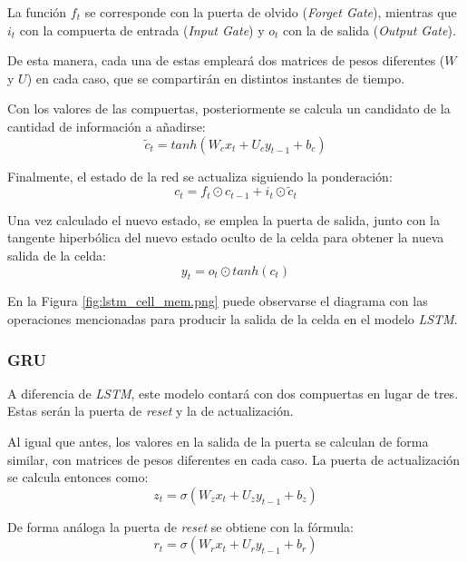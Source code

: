 La función \(f_t\) se corresponde con la puerta de olvido (\textit{Forget Gate}), mientras que 
\(i_t\) con la compuerta de entrada (\textit{Input Gate}) y \(o_t\) con la de salida (\textit{Output
Gate}).

De esta manera, cada una de estas empleará dos matrices de pesos diferentes (\(W\) y \(U\)) en cada caso, que se compartirán
en distintos instantes de tiempo.

Con los valores de las compuertas, posteriormente se calcula un candidato de la cantidad de información
a añadirse:
\begin{equation}
    \widetilde{c}_t = tanh (W_{c} x_t + U_{c} y_{t-1} + b_c) 
\end{equation}

Finalmente, el estado de la red se actualiza siguiendo la ponderación:
\begin{equation}
    c_t = f_t \odot  c_{t-1} + i_{t} \odot \widetilde{c}_t 
\end{equation}

Una vez calculado el nuevo estado, se emplea la puerta de salida, junto con la tangente hiperbólica
del nuevo estado oculto de la celda para obtener la nueva salida de la celda:
\begin{equation}
    y_t =  o_t \odot tanh(c_t)
\end{equation}

En la Figura \ref{fig:lstm_cell_mem.png} puede observarse el diagrama con las operaciones mencionadas
para producir la salida de la celda en el modelo \textit{LSTM}.

\subsubsection{GRU}
A diferencia de \textit{LSTM}, este modelo contará con dos compuertas en lugar 
de tres. Estas serán la puerta de \textit{reset} y la de actualización.

Al igual que antes, los valores en la salida de la puerta se calculan de forma similar,
con matrices de pesos diferentes en cada caso.
La puerta de actualización se calcula entonces como:
\begin{equation}
    z_t = \sigma(W_z x_t + U_z y_{t-1} + b_z)
\end{equation}

De forma análoga la puerta de \textit{reset} se obtiene con la fórmula:
\begin{equation}
    r_t = \sigma(W_r x_t + U_r y_{t-1} + b_r)
\end{equation}

